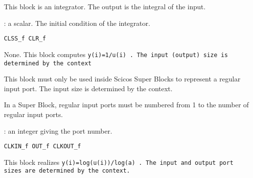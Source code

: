 \label{INTEGRALf}

This block is an integrator. The output is the integral of the input.
\begin{scitem}
\item[{\verb?Initial state?}]
: a scalar. The initial condition of the integrator.
\end{scitem}%
{\verb?CLSS_f CLR_f?} \pageref{CLSSfCLRf}







%
%


\label{INVBLKf}

None.
This block computes %
\tt y(i)=1/u(i)%
\rm . The input (output) size is
determined by the context
%
%


\label{INf}

This block must only be used inside Scicos Super Blocks to represent
a regular input port. The input size is determined by the context.
\par\noindent
In a Super Block, regular input ports must be numbered from 1 to the
number of regular input ports.
\begin{scitem}
\item[{\verb?Port number?}]
: an integer giving the port number.
\end{scitem}%
{\verb?CLKIN_f OUT_f CLKOUT_f?} \pageref{CLKINfOUTfCLKOUTf}
%
%


\label{LOGBLKf}

\begin{scitem}
\item[{\verb?a : real scalar greater than 1?}]
\end{scitem}%
This block realizes %
\tt y(i)=log(u(i))/log(a)%
\rm . The input and output port sizes
are determined by the context.


